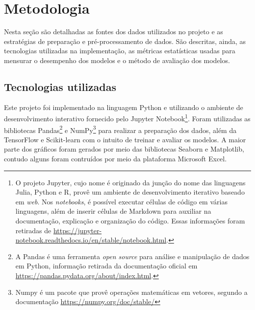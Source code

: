 
\chapter{Metodologia}



Nesta seção são detalhadas as fontes dos dados utilizados no 
projeto e as estratégias de preparação e pré-processamento de 
dados. São descritas, ainda, as 
tecnologias utilizadas na implementação, as métricas estatísticas 
usadas para mensurar o desempenho dos modelos e o método de
 avaliação dos modelos.

\section{Tecnologias utilizadas}

Este projeto foi implementado na linguagem Python e 
utilizando o ambiente de desenvolvimento interativo fornecido pelo Jupyter Notebook\footnote{O projeto Jupyter, cujo nome é originado da junção do nome das linguagens Julia, Python e R, provê um 
ambiente de desenvolvimento iterativo baseado em \textit{web}. Nos \textit{notebooks}, é possível executar células de código 
em várias linguagens, além de inserir células de Markdown para auxiliar na documentação, explicação e organização do código. Essas informações foram 
retiradas de \url{https://jupyter-notebook.readthedocs.io/en/stable/notebook.html}.}.
Foram utilizadas as bibliotecas Pandas\footnote{A Pandas é uma ferramenta \textit{open source} para análise e manipulação de dados em Python, informação retirada da documentação oficial em \url{https://pandas.pydata.org/about/index.html}.} e NumPy\footnote{
Numpy é um pacote que provê operações matemáticas em vetores, segundo a documentação \url{https://numpy.org/doc/stable/}
} para realizar a preparação dos dados,
além da TensorFlow e Scikit-learn com o intuito de treinar e avaliar os modelos.
A maior parte dos gráficos foram gerados por meio das bibliotecas 
Seaborn e Matplotlib, contudo alguns foram contruídos por meio da plataforma
Microsoft Excel.

